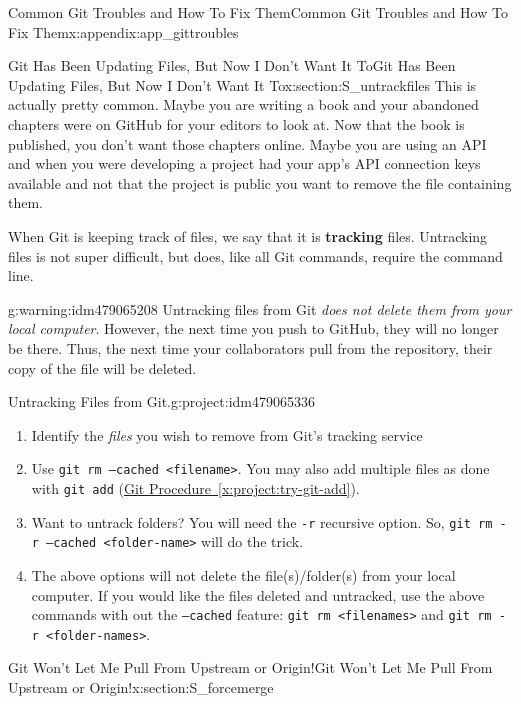 \documentclass[oneside,10pt,]{book}
\newcommand{\xreffont}{\relax}
\newcommand{\mono}[1]{\texttt{#1}}
\newcommand{\terminology}[1]{\textbf{#1}}
\begin{document}
\begin{appendixptx}{Common Git Troubles and How To Fix Them}{}{Common Git Troubles and How To Fix Them}{}{}{x:appendix:app_gittroubles}
\begin{sectionptx}{Git Has Been Updating Files, But Now I Don't Want It To}{}{Git Has Been Updating Files, But Now I Don't Want It To}{}{}{x:section:S_untrackfiles}
%
%
This is actually pretty common. Maybe you are writing a book and your abandoned chapters were on GitHub for your editors to look at. Now that the book is published, you don't want those chapters online. Maybe you are using an API and when you were developing a project had your app's API connection keys available and not that the project is public you want to remove the file containing them.%
\par
When Git is keeping track of files, we say that it is \terminology{tracking} files. Untracking files is not super difficult, but does, like all Git commands, require the command line.%
\begin{warning}{}{g:warning:idm479065208}%
Untracking files from Git \emph{does not delete them from your local computer}. However, the next time you push to GitHub, they will no longer be there. Thus, the next time your collaborators pull from the repository, their copy of the file will be deleted.%
\end{warning}
\begin{project}{Untracking Files from Git.}{g:project:idm479065336}%
\begin{enumerate}[font=\bfseries,label=(\alph*),ref=\alph*]
\item{}Identify the \emph{files} you wish to remove from Git's tracking service%
\item{}Use \mono{git rm --cached <filename>}. You may also add multiple files as done with \mono{git add} (\hyperref[x:project:try-git-add]{Git Procedure~{\xreffont\ref{x:project:try-git-add}}}).%
\item{}Want to untrack folders? You will need the \mono{-r} recursive option. So, \mono{git rm -r --cached <folder-name>} will do the trick.%
\item{}The above options will not delete the file(s)\slash{}folder(s) from your local computer. If you would like the files deleted and untracked, use the above commands with out the \mono{--cached} feature: \mono{git rm <filenames>} and \mono{git rm -r <folder-names>}.%
\end{enumerate}
\end{project}%
\end{sectionptx}
%
%
\typeout{************************************************}
\typeout{************************************************}
%
\begin{sectionptx}{Git Won't Let Me Pull From Upstream or Origin!}{}{Git Won't Let Me Pull From Upstream or Origin!}{}{}{x:section:S_forcemerge}

\end{sectionptx}
\end{appendixptx}
\end{document}
